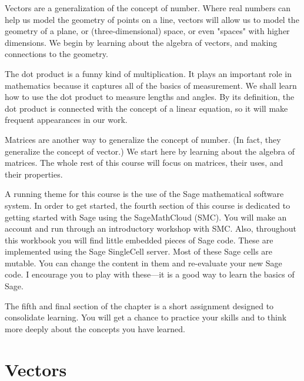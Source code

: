 \documentclass[10pt,]{book}
\theoremstyle{plain}
\numberwithin{equation}{section}
\begin{document}
      Vectors are a generalization of the concept of number. Where real numbers
      can help us model the geometry of points on a line, vectors will allow us to
      model the geometry of a plane, or (three-dimensional) space, or even "spaces"
      with higher dimensions. We begin by learning about the algebra of vectors,
      and making connections to the geometry.
\par

      The dot product is a funny kind of multiplication. It plays an important
      role in mathematics because it captures all of the basics of measurement.
      We shall learn how to use the dot product to measure lengths and angles. By
      its definition, the dot product is connected with the concept of a linear
      equation, so it will make frequent appearances in our work.
\par

      Matrices are another way to generalize the concept of number. (In fact, they
      generalize the concept of vector.) We start here by learning about the
      algebra of matrices. The whole rest of this course will focus on matrices,
      their uses, and their properties.
\par

      A running theme for this course is the use of the Sage mathematical software
      system. In order to get started, the fourth section of this course is
      dedicated to getting started with Sage using the SageMathCloud (SMC). You will
      make an account and run through an introductory workshop with SMC.
      Also, throughout this workbook you will find little embedded pieces of Sage
      code. These are implemented using the Sage SingleCell server. Most of these
      Sage cells are mutable. You can change the content in them and re-evaluate
      your new Sage code. I encourage you to play with these---it is a good way to
      learn the basics of Sage.
\par

      The fifth and final section of the chapter is a short assignment designed to
      consolidate learning. You will get a chance to practice your skills and to
      think more deeply about the concepts you have learned.
\typeout{************************************************}
\typeout{************************************************}
\section[Vectors]{Vectors}\label{vectors}
\typeout{************************************************}
\typeout{************************************************}
\end{document}
